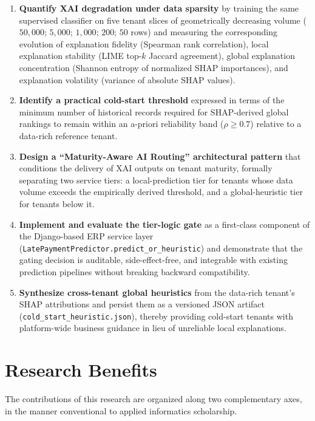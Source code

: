 \begin{enumerate}[label=\arabic*.]
  \item \textbf{Quantify XAI degradation under data sparsity} by training the same supervised classifier on five tenant slices of geometrically decreasing volume ($50{,}000$; $5{,}000$; $1{,}000$; $200$; $50$ rows) and measuring the corresponding evolution of explanation fidelity (Spearman rank correlation), local explanation stability (LIME top-$k$ Jaccard agreement), global explanation concentration (Shannon entropy of normalized SHAP importances), and explanation volatility (variance of absolute SHAP values).

  \item \textbf{Identify a practical cold-start threshold} expressed in terms of the minimum number of historical records required for SHAP-derived global rankings to remain within an a-priori reliability band ($\rho \geq 0.7$) relative to a data-rich reference tenant.

  \item \textbf{Design a ``Maturity-Aware AI Routing'' architectural pattern} that conditions the delivery of XAI outputs on tenant maturity, formally separating two service tiers: a local-prediction tier for tenants whose data volume exceeds the empirically derived threshold, and a global-heuristic tier for tenants below it.

  \item \textbf{Implement and evaluate the tier-logic gate} as a first-class component of the Django-based ERP service layer (\texttt{LatePaymentPredictor.predict\_or\_heuristic}) and demonstrate that the gating decision is auditable, side-effect-free, and integrable with existing prediction pipelines without breaking backward compatibility.

  \item \textbf{Synthesize cross-tenant global heuristics} from the data-rich tenant's SHAP attributions and persist them as a versioned JSON artifact (\texttt{cold\_start\_heuristic.json}), thereby providing cold-start tenants with platform-wide business guidance in lieu of unreliable local explanations.
\end{enumerate}

\section{Research Benefits}
\label{sec:benefits}

The contributions of this research are organized along two complementary axes, in the manner conventional to applied informatics scholarship.

